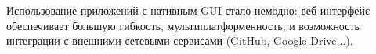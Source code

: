\label{wx}\secdown

Использование приложений с нативным GUI стало немодно: веб-интерфейс
обеспечивает большую гибкость, мультиплатформенность, и возможность интеграции с
внешними сетевыми сервисами (GitHub, Google Drive,..).

\clearpage
{}

\secup